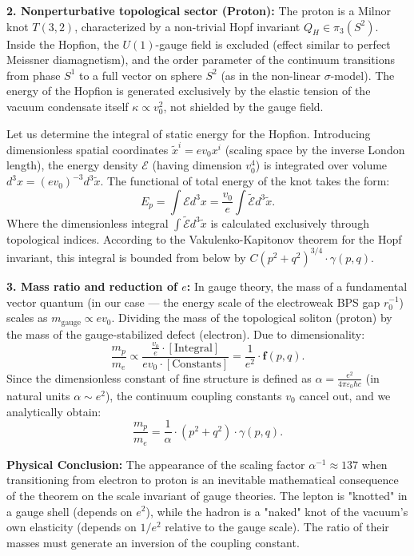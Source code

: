 \documentclass[11pt,a4paper]{article}
\begin{document}
\textbf{2. Nonperturbative topological sector (Proton):}
The proton is a Milnor knot $T(3,2)$, characterized by a non-trivial Hopf invariant $Q_H \in \pi_3(S^2)$. 
Inside the Hopfion, the $U(1)$-gauge field is excluded (effect similar to perfect Meissner diamagnetism), and the order parameter of the continuum transitions from phase $S^1$ to a full vector on sphere $S^2$ (as in the non-linear $\sigma$-model). The energy of the Hopfion is generated exclusively by the elastic tension of the vacuum condensate itself $\kappa \propto v_0^2$, not shielded by the gauge field.

Let us determine the integral of static energy for the Hopfion. Introducing dimensionless spatial coordinates $\tilde{x}^i = e v_0 x^i$ (scaling space by the inverse London length), the energy density $\mathcal{E}$ (having dimension $v_0^4$) is integrated over volume $d^3x = (e v_0)^{-3} d^3\tilde{x}$.
The functional of total energy of the knot takes the form:
\begin{equation}
	E_p = \int \mathcal{E} d^3x = \frac{v_0}{e} \int \tilde{\mathcal{E}} d^3\tilde{x}.
\end{equation}
Where the dimensionless integral $\int \tilde{\mathcal{E}} d^3\tilde{x}$ is calculated exclusively through topological indices. According to the Vakulenko-Kapitonov theorem for the Hopf invariant, this integral is bounded from below by $C (p^2+q^2)^{3/4} \cdot \gamma(p,q)$.

\textbf{3. Mass ratio and reduction of $e$:}
In gauge theory, the mass of a fundamental vector quantum (in our case — the energy scale of the electroweak BPS gap $r_0^{-1}$) scales as $m_{\text{gauge}} \propto e v_0$.
Dividing the mass of the topological soliton (proton) by the mass of the gauge-stabilized defect (electron). Due to dimensionality:
\begin{equation}
	\frac{m_p}{m_e} \propto \frac{\frac{v_0}{e} \cdot [\text{Integral}]}{e v_0 \cdot [\text{Constants}]} = \frac{1}{e^2} \cdot \mathbf{f}(p,q).
\end{equation}
Since the dimensionless constant of fine structure is defined as $\alpha = \frac{e^2}{4\pi\varepsilon_0 \hbar c}$ (in natural units $\alpha \sim e^2$), the continuum coupling constants $v_0$ cancel out, and we analytically obtain:
\begin{equation}
	\frac{m_p}{m_e} = \frac{1}{\alpha} \cdot (p^2+q^2) \cdot \gamma(p,q).
\end{equation}

\textbf{Physical Conclusion:} The appearance of the scaling factor $\alpha^{-1} \approx 137$ when transitioning from electron to proton is an inevitable mathematical consequence of the theorem on the scale invariant of gauge theories. The lepton is "knotted" in a gauge shell (depends on $e^2$), while the hadron is a "naked" knot of the vacuum's own elasticity (depends on $1/e^2$ relative to the gauge scale). The ratio of their masses must generate an inversion of the coupling constant.
	
\end{document}
